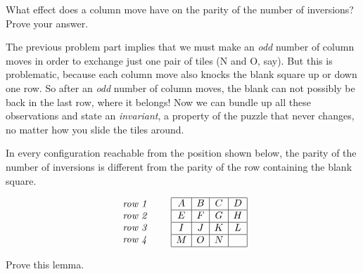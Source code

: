 \documentclass[twoside,12pt]{article}
\begin{document}
\begin{problem}{20}
What effect does a column move have on the parity of the number of
inversions?  Prove your answer.


The previous problem part 
implies that we must make an \textit{odd} number of column
moves in order to exchange just one pair of tiles (N and O, say).
But this is problematic, because each column move also knocks the
blank square up or down one row.  So after an \textit{odd} number of
column moves, the blank can not possibly be back in the last row,
where it belongs!  Now we can bundle up all these observations and
state an \emph{invariant}, a property of the puzzle that never changes, no
matter how you slide the tiles around.

\begin{lemma*}
In every configuration reachable from the position shown below, the
parity of the number of inversions is different from the parity of the
row containing the blank square.

\[
\begin{array}{l}
\textit{row 1} \\
\textit{row 2} \\
\textit{row 3} \\
\textit{row 4} \\
\end{array}
\qquad
\begin{array}{|c|c|c|c|}
\hline
A & B & C & D \\ \hline
E & F & G & H \\ \hline
I & J & K & L \\ \hline
M & O & N &  \\ \hline
\end{array}
\]
\end{lemma*}

Prove this lemma.

\end{problem}
\end{document}
